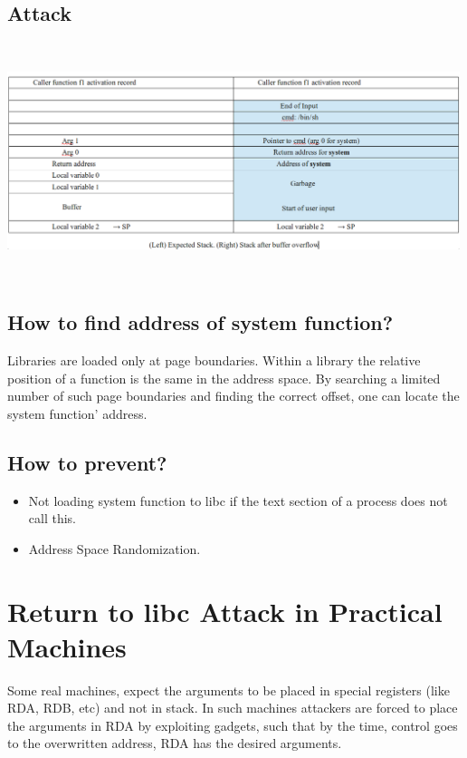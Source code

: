 \documentclass[11pt]{article} %
\begin{document}
\subsection {Attack}
\includegraphics [width=500px,height=260px] {img/img4.png}

\subsection {How to find address of system function?}
Libraries are loaded only at page boundaries. Within a library the relative
position of a function is the same in the address space. By searching a limited
number of such page boundaries and finding the correct offset, one can locate
the system function' address.

\subsection {How to prevent?}
\begin {itemize} \itemsep -2pt
\item Not loading system function to libc if the text section of a process
does not call this.
\item Address Space Randomization.
\end {itemize}

\section {Return to libc Attack in Practical Machines}
Some real machines, expect the arguments to be placed in special registers 
(like RDA, RDB, etc) and not in stack. In such machines attackers are forced to
place the arguments in RDA by exploiting gadgets, such that by the time, control
goes to the overwritten address, RDA has the desired arguments.
\end{document}
